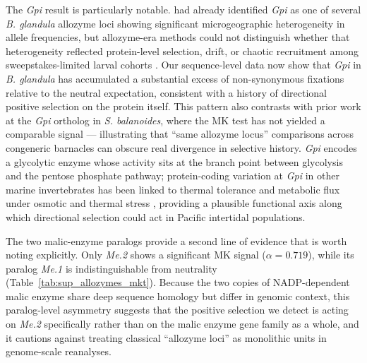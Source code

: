 \documentclass[11pt]{article}
\newcommand{\bgla}{\textit{B. glandula}\xspace}
\begin{document}
The \textit{Gpi} result is particularly notable.
\cite{hedgecock_temporal_1994} had already identified \textit{Gpi} as one of several
\bgla{} allozyme loci showing significant microgeographic heterogeneity in allele
frequencies, but allozyme-era methods could not distinguish whether that heterogeneity
reflected protein-level selection, drift, or chaotic recruitment among sweepstakes-limited
larval cohorts \citep{hedgecock_does_1994}.
Our sequence-level data now show that \textit{Gpi} in \bgla{} has accumulated a
substantial excess of non-synonymous fixations relative to the neutral expectation,
consistent with a history of directional positive selection on the protein itself.
This pattern also contrasts with prior work at the \textit{Gpi} ortholog in
\textit{S. balanoides}, where the MK test has not yielded a comparable signal
\citep{nunez_footprints_2020,rand_ecological_2002} --- illustrating that ``same allozyme
locus'' comparisons across congeneric barnacles can obscure real divergence in
selective history.
\textit{Gpi} encodes a glycolytic enzyme whose activity sits at the branch point between
glycolysis and the pentose phosphate pathway; protein-coding variation at \textit{Gpi}
in other marine invertebrates has been linked to thermal tolerance and metabolic
flux under osmotic and thermal stress \citep{flight_allozyme_2012}, providing a
plausible functional axis along which directional selection could act in Pacific
intertidal populations.
\vspace{0.2cm}

The two malic-enzyme paralogs provide a second line of evidence that is worth noting
explicitly.
Only \textit{Me.2} shows a significant MK signal ($\alpha = 0.719$), while its paralog
\textit{Me.1} is indistinguishable from neutrality (Table~\ref{tab:sup_allozymes_mkt}).
Because the two copies of NADP-dependent malic enzyme share deep sequence homology but
differ in genomic context, this paralog-level asymmetry suggests that the positive
selection we detect is acting on \textit{Me.2} specifically rather than on the malic
enzyme gene family as a whole, and it cautions against treating classical ``allozyme
loci'' as monolithic units in genome-scale reanalyses.
\vspace{0.2cm}

\end{document}
